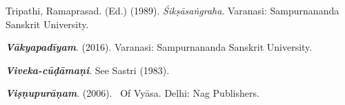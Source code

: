 \begin{thebibliography}{99}
  Tripathi, Ramaprasad. (Ed.) (1989). \textit{Śikṣāsaṅgraha}. Varanasi: Sampurnananda Sanskrit University. 

  \textbf{\textit{Vākyapadīyam}}. (2016). Varanasi: Sampurnananda Sanskrit University.

  \textbf{\textit{Viveka-cūḍāmaṇi}}. See Sastri (1983).

  \textbf{\textit{Viṣṇupurāṇam}}. (2006).  Of Vyāsa. Delhi: Nag Publishers. \\

 \end{thebibliography}

\theendnotes

